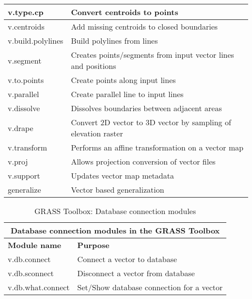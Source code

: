 \begin{table}[ht]
\begin{tabular}{|p{4cm}|p{12cm}|}
  \hline v.type.cp & Convert centroids to points \\
  \hline v.centroids & Add missing centroids to closed boundaries  \\
  \hline v.build.polylines & Build polylines from lines \\
  \hline v.segment & Creates points/segments from input vector lines and
  positions \\
  \hline v.to.points & Create points along input lines \\
  \hline v.parallel & Create parallel line to input lines \\
  \hline v.dissolve & Dissolves boundaries between adjacent areas \\
  \hline v.drape & Convert 2D vector to 3D vector by sampling of elevation
  raster\\
  \hline v.transform & Performs an affine transformation on a vector map \\
  \hline v.proj & Allows projection conversion of vector files \\
  \hline v.support & Updates vector map metadata \\
  \hline generalize & Vector based generalization \\
\hline
\end{tabular}
\end{table}

\begin{table}[ht]
\centering
\caption{GRASS Toolbox: Database connection modules}\medskip
 \begin{tabular}{|p{4cm}|p{12cm}|}
  \hline \multicolumn{2}{|c|}{\textbf{Database connection modules in the GRASS
  Toolbox}} \\
  \hline \textbf{Module name} & \textbf{Purpose} \\
  \hline v.db.connect & Connect a vector to database \\
  \hline v.db.sconnect & Disconnect a vector from database \\
  \hline v.db.what.connect & Set/Show database connection for a vector \\
\hline
\end{tabular}
\end{table}


